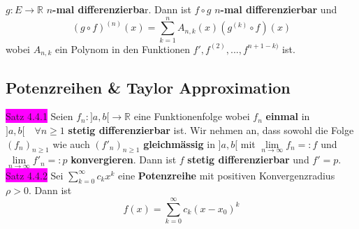\documentclass[landscape, 10pt]{article}
\newcommand{\R}{\mathbb{R}}
\begin{document}
\begin{multicols}{3}
                     \textcolor{NavyBlue}{$g:E\longrightarrow\R$} 
                     \textbf{$n$-mal differenzierba}r.
                     Dann ist \textcolor{NavyBlue}{$f\circ g$} 
                     $n$\textbf{-mal differenzierbar} und 
                     \begin{equation*}
                            (g\circ f)^{(n)}(x)
                            =\sum_{k=1}^nA_{n,k}(x)
                            (g^{(k)}\circ f)(x)
                     \end{equation*}
                     wobei \textcolor{NavyBlue}{$A_{n,k}$} 
                     ein Polynom in den Funktionen 
                     \textcolor{NavyBlue}{
                     $f',f^{(2)},...,f^{n+1-k)}$} ist.
       \subsection{Potenzreihen \& Taylor Approximation}
              \colorbox{magenta}{Satz 4.4.1} 
                     Seien \textcolor{NavyBlue}{
                     $f_n:]a,b[\longrightarrow\R$} 
                     eine Funktionenfolge wobei 
                     \textcolor{NavyBlue}{$f_n$} 
                     \textbf{einmal} in 
                     \textcolor{NavyBlue}{
                     $]a,b[\quad\forall n\geqslant1$} 
                     \textbf{stetig differenzierbar} ist.
                     Wir nehmen an, dass sowohl die Folge 
                     \textcolor{NavyBlue}{$(f_n)_{n\geqslant1}$} 
                     wie auch \textcolor{NavyBlue}{
                     $(f'_n)_{n\geqslant1}$} 
                     \textbf{gleichmässig} in 
                     \textcolor{NavyBlue}{$]a,b[$} mit 
                     \textcolor{NavyBlue}{
                     $\lim\limits_{n\to\infty}f_n=:f$} 
                     und \textcolor{NavyBlue}{
                     $\lim\limits_{n\to\infty}f'_n=:p$}
                     \textbf{konvergieren}. 
                     Dann ist \textcolor{NavyBlue}{$f$}
                     \textbf{stetig differenzierbar} 
                     und \textcolor{NavyBlue}{$f'=p$}. \\
              \colorbox{magenta}{Satz 4.4.2} 
                     Sei \textcolor{NavyBlue}{
                     $\sum_{k=0}^\infty c_kx^k$} 
                     eine \textbf{Potenzreihe} mit 
                     positiven Konvergenzradius 
                     \textcolor{NavyBlue}{$\rho>0$}. Dann ist
                     \begin{equation*}
                          f(x)=\sum_{k=0}^\infty c_k(x-x_0)^k  

\end{equation*}
\end{multicols}
\end{document}
